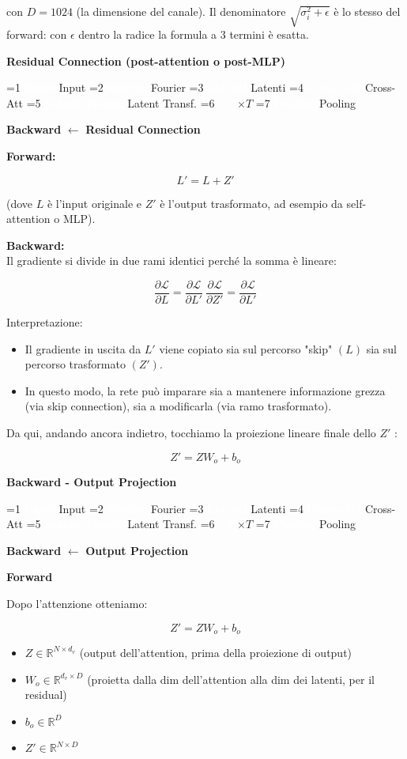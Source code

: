 \documentclass[
  11pt,
]{article}
\newcommand{\currentstep}[1]{%
\begin{tcolorbox}[colback=red!3, colframe=red!40!black, boxrule=0.3pt, arc=2pt,
  left=4pt, right=4pt, top=2pt, bottom=2pt]
{\footnotesize\textbf{Backward} $\longleftarrow$ \textbf{#1}}
\end{tcolorbox}}
\newcommand{\mystripchip}[3]{%
  \setlength{\fboxsep}{2.8pt}%
  \ifnum#3=#1\relax
    \colorbox{seccolor}{\textcolor{white}{\bfseries #2}}%
  \else
    \colorbox{seccolor!8}{\textcolor{seccolor!55}{#2}}%
  \fi}
\newcommand{\mystriparr}{{\fontsize{8}{8}\selectfont\;\textcolor{seccolor!45}{$\rightarrow$}\;}}
\newcommand{\mystrip}[1]{%
\begin{center}
{\sffamily\fontsize{7.5}{9}\selectfont
\mystripchip{1}{Input}{#1}\mystriparr\mystripchip{2}{Fourier}{#1}\mystriparr\mystripchip{3}{Latenti}{#1}\mystriparr%
\mystripchip{4}{Cross-Att}{#1}\mystriparr\mystripchip{5}{Latent Transf.}{#1}\mystriparr%
\mystripchip{6}{$\times T$}{#1}\mystriparr\mystripchip{7}{Pooling}{#1}}
\end{center}}
\renewcommand{\currentstep}[2][0]{%
\mystrip{#1}%
\begin{tcolorbox}[colback=red!3, colframe=red!40!black, boxrule=0.3pt, arc=2pt,
  left=4pt, right=4pt, top=2pt, bottom=2pt]
{\footnotesize\textbf{Backward} $\longleftarrow$ \textbf{#2}}
\end{tcolorbox}}
\begin{document}
con \(D = 1024\) (la dimensione del canale). Il denominatore $\sqrt{\sigma_i^2 + \epsilon}$ è lo stesso del forward: con $\epsilon$ dentro la radice la formula a 3 termini è esatta.

\textbf{Residual Connection (post-attention o post-MLP)}

\currentstep[5]{Residual Connection}

\textbf{Forward:}

\[L' = L + Z'\]

(dove \(L\) è l'input originale e \(Z'\) è
l'output trasformato, ad esempio da self-attention o
MLP).

\textbf{Backward:}\\
Il gradiente si divide in due rami identici perché la somma è lineare:

\[\frac{\partial\mathcal{L}}{\partial L} = \frac{\partial\mathcal{L}}{\partial L'}\ \frac{\partial\mathcal{L}}{\partial Z'} = \frac{\partial\mathcal{L}}{\partial L'}\]

Interpretazione:

\begin{itemize}
\item
  Il gradiente in uscita da \(L'\) viene copiato sia sul percorso "skip"
  \((L)\) sia sul percorso trasformato \(\left( Z' \right)\).
\item
  In questo modo, la rete può imparare sia a mantenere informazione
  grezza (via skip connection), sia a modificarla (via ramo
  trasformato).
\end{itemize}

Da qui, andando ancora indietro, tocchiamo la proiezione lineare finale
dello \(Z'\) :

\[Z' = ZW_{o} + b_o\]

\textbf{Backward - Output Projection}

\currentstep[5]{Output Projection}

\textbf{Forward}

Dopo l'attenzione otteniamo:

\[Z' = ZW_{o} + b_{o}\]

\begin{itemize}
\item
  \(Z \in \mathbb{R}^{N \times d_v}\) (output dell'attention, prima della proiezione di output)
\item
  \(W_{o} \in \mathbb{R}^{d_v \times D}\) (proietta dalla dim dell'attention alla dim dei latenti, per il residual)
\item
  \(b_{o} \in \mathbb{R}^{D}\)
\item
  \(Z' \in \mathbb{R}^{N \times D}\)
\end{itemize}
\end{document}
